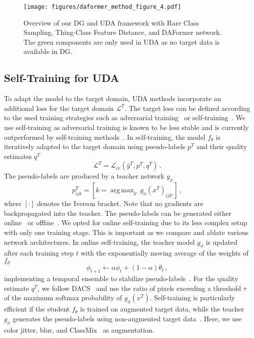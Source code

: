 \documentclass[journal,compsoc]{IEEEtran}
\DeclareMathOperator*{\argmax}{arg\,max}
\begin{document}
\begin{figure*}
    \centering
    \texttt{[image: figures/daformer\_method\_figure\_4.pdf]}
    \caption{Overview of our DG and UDA framework with Rare Class Sampling, Thing-Class Feature Distance, and DAFormer network. The green components are only used in UDA as no target data is available in DG.}
    \label{fig:daformer_overview}
\end{figure*}

\subsection{Self-Training for UDA}
\label{sec:methods_self_training}

To adapt the model to the target domain, UDA methods incorporate an additional loss for the target domain $\mathcal{L}^T$.
The target loss can be defined according to the used training strategies such as adversarial training~\cite{tsai2018learning,wang2020classes} or self-training~\cite{zou2018unsupervised,tranheden2021dacs,zhang2021prototypical}. 
We use self-training as adversarial training is known to be less stable and is currently outperformed by self-training methods~\cite{tranheden2021dacs, zhang2021prototypical}.
In self-training, the model $f_\theta$ is iteratively adapted to the target domain using pseudo-labels $p^T$ and their quality estimates $q^T$
\begin{equation}
    \mathcal{L}^T = \mathcal{L}_\mathit{ce}(\hat{y}^T, p^T, q^T)\,.
\end{equation}
The pseudo-labels are produced by a teacher network $g_\phi$
\begin{equation}
    p_{ijk}^T = [k = \argmax_{k'} g_\phi(x^T)_{ijk'}]\,,
\end{equation}
where $[\cdot]$ denotes the Iverson bracket.
Note that no gradients are backpropagated into the teacher.
The pseudo-labels can be generated either online~\cite{araslanov2021self,tranheden2021dacs} or offline~\cite{zou2018unsupervised, zou2019confidence}.
We opted for online self-training due to its less complex setup with only one training stage. This is important as we compare and ablate various network architectures.
In online self-training, the teacher model $g_\phi$ is updated after each training step $t$ with the exponentially moving average of the weights of $f_\theta$
\begin{equation}
    \phi_{t+1} \leftarrow \alpha \phi_t + (1 - \alpha) \theta_t\,,
\end{equation}
implementing a temporal ensemble to stabilize pseudo-labels~\cite{tarvainen2017mean}.
For the quality estimate $q^T$, we follow DACS~\cite{tranheden2021dacs} and use the ratio of pixels exceeding a threshold $\tau$ of the maximum softmax probability of $g_\phi(x^T)$.
Self-training is particularly efficient if the student $f_\theta$ is trained on augmented target data, while the teacher $g_\phi$ generates the pseudo-labels using non-augmented target data~\cite{tarvainen2017mean, tranheden2021dacs, araslanov2021self}.
Here, we use color jitter, blur, and ClassMix~\cite{olsson2020classmix} as augmentation.
\end{document}
